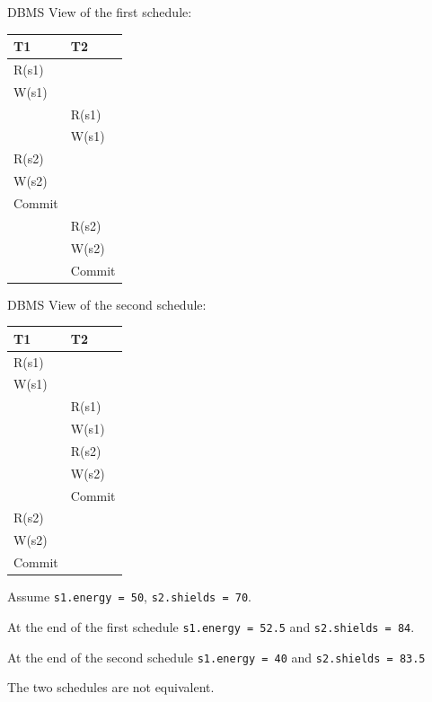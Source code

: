 \documentclass{beamer}
\begin{document}
\begin{slide}{
		\item DBMS View of the first schedule:
		\begin{table}
			\tiny
			\begin{tabular}{l|l}
				T1 & T2\\
				\hline
				R(s1) & \\
				W(s1) & \\
				& R(s1) \\
				& W(s1) \\
				R(s2) & \\
				W(s2) & \\
				Commit & \\
				& R(s2) \\
				& W(s2) \\
				& Commit\\		
			\end{tabular}
		\end{table}
		\item DBMS View of the second schedule:
		\begin{table}
			\tiny
			\begin{tabular}{l|l}
				T1 & T2\\
				\hline
				R(s1) & \\
				W(s1) & \\
				 & R(s1) \\
				 & W(s1) \\
				 & R(s2) \\
				 & W(s2) \\
				 & Commit \\
				 R(s2) \\
				 W(s2) \\
				 Commit \\		
			\end{tabular}
		\end{table}
}\end{slide}

\begin{slide}{
	\item Assume \texttt{s1.energy = 50}, \texttt{s2.shields = 70}.
	\item At the end of the first schedule \texttt{s1.energy = 52.5} and \texttt{s2.shields = 84}.
	\item At the end of the second schedule \texttt{s1.energy = 40} and \texttt{s2.shields = 83.5}
	\item The two schedules are not equivalent.
}\end{slide}
\end{document}
